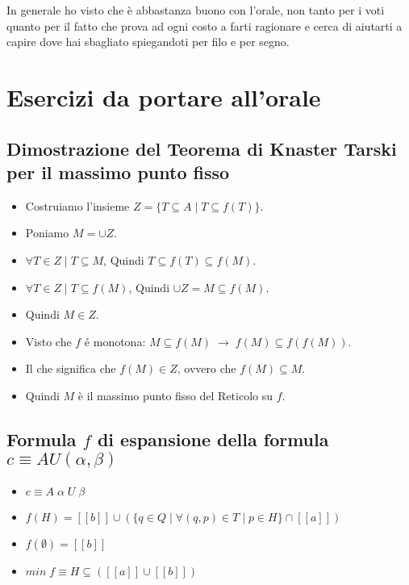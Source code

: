 In generale ho visto che \`e abbastanza buono con l'orale, non tanto per i voti quanto per il fatto che prova ad ogni costo a farti ragionare e cerca di aiutarti a capire dove hai sbagliato spiegandoti per filo e per segno.

\section{Esercizi da portare all'orale}

\subsection{Dimostrazione del Teorema di Knaster Tarski per il massimo punto fisso}

\begin{itemize}
    \item Costruiamo l’insieme $Z = \{ T \subseteq A \; | \; T \subseteq f(T) \}$.
    \item Poniamo $M = \cup Z$.
    \item $\forall T \in Z \; | \; T \subseteq M$, Quindi $T \subseteq f(T) \subseteq f(M)$.
    \item $\forall T \in Z \; | \; T \subseteq f(M)$, Quindi $\cup Z = M \subseteq f(M)$.
    \item Quindi $M \in Z$.
    \item Visto che $f$ \'e monotona: $M \subseteq f(M) \; \rightarrow \; f(M) \subseteq f(f(M))$.
    \item Il che significa che $f(M) \in Z$, ovvero che $f(M) \subseteq M$.
    \item Quindi $M$ \`e il massimo punto fisso del Reticolo su $f$.
\end{itemize}

\subsection{Formula $f$ di espansione della formula $c \equiv AU(\alpha, \beta)$}

\begin{itemize}
    \item $c \equiv A \; \alpha \; U \; \beta$
    \item $f(H) = [[b]] \cup (\{q \in Q \; | \; \forall(q,p) \in T \; | \; p \in H\} \cap [[a]])$
    \item $f(\emptyset) = [[b]]$
    \item $min \; f \equiv H \subseteq ([[a]] \cup [[b]])$
\end{itemize}
